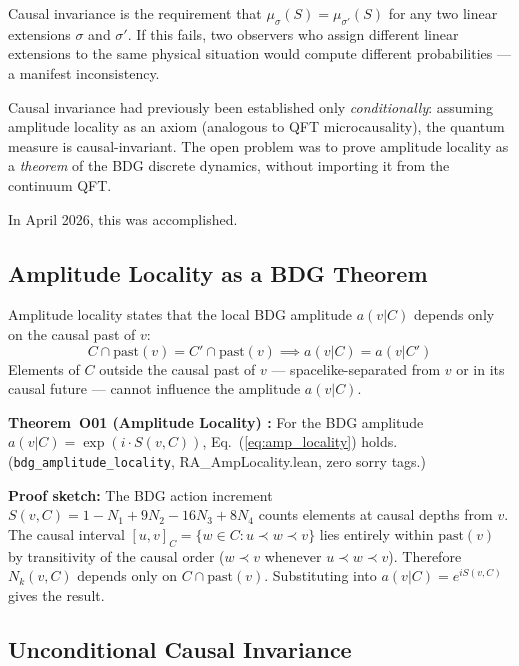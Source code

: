\documentclass[12pt,a4paper]{article}
\begin{document}
Causal invariance is the requirement that $\mu_\sigma(S)=\mu_{\sigma'}(S)$ for any two linear extensions $\sigma$ and $\sigma'$.  If this fails, two observers who assign different linear extensions to the same physical situation would compute different probabilities --- a manifest inconsistency.

Causal invariance had previously been established only \emph{conditionally}: assuming amplitude locality as an axiom (analogous to QFT microcausality), the quantum measure is causal-invariant.  The open problem was to prove amplitude locality as a \emph{theorem} of the BDG discrete dynamics, without importing it from the continuum QFT.

In April 2026, this was accomplished.

\subsection{Amplitude Locality as a BDG Theorem}

Amplitude locality states that the local BDG amplitude $a(v|C)$ depends only on the causal past of $v$:
\begin{equation}
  C\cap\mathrm{past}(v) = C'\cap\mathrm{past}(v) \implies a(v|C) = a(v|C')
  \label{eq:amp_locality}
\end{equation}
Elements of $C$ outside the causal past of $v$ --- spacelike-separated from $v$ or in its causal future --- cannot influence the amplitude $a(v|C)$.

\begin{leanbox}
\textbf{Theorem~O01 (Amplitude Locality) \statusLV:}
For the BDG amplitude $a(v|C)=\exp(i\cdot S(v,C))$, Eq.~(\ref{eq:amp_locality}) holds.  (\texttt{bdg\_amplitude\_locality}, RA\_AmpLocality.lean, zero sorry tags.)

\textbf{Proof sketch:} The BDG action increment $S(v,C)=1-N_1+9N_2-16N_3+8N_4$ counts elements at causal depths from $v$.  The causal interval $[u,v]_C = \{w\in C : u\prec w\prec v\}$ lies entirely within $\mathrm{past}(v)$ by transitivity of the causal order ($w\prec v$ whenever $u\prec w\prec v$).  Therefore $N_k(v,C)$ depends only on $C\cap\mathrm{past}(v)$.  Substituting into $a(v|C)=e^{iS(v,C)}$ gives the result.
\end{leanbox}

\subsection{Unconditional Causal Invariance}
\end{document}
